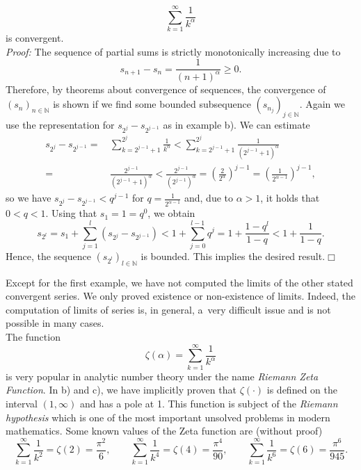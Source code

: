 \begin{example}
\begin{enumerate}[(a)]
\[ \sum_{k=1}^\infty \frac1{k^\alpha}\]
is convergent.\\
{\em Proof:} The sequence of partial sums is strictly monotonically increasing due to
\[s_{n+1}-s_n=\frac1{(n+1)^\alpha}\geq0.\]
Therefore, by theorems about convergence of sequences, the convergence of $(s_n)_{n\in\mathbb{N}}$ is shown if we find some 
bounded subsequence $(s_{n_j})_{j\in\mathbb{N}}$. Again we use the representation for $s_{2^j}-s_{2^{j-1}}$
as in example b). We can estimate
\[
\begin{aligned}
s_{2^j}-s_{2^{j-1}}=&\,\sum_{k=2^{j-1}+1}^{2^j}\frac1{k^\alpha}<\sum_{k=2^{j-1}+1}^{2^j}\frac1{(2^{j-1}+1)^\alpha}\\
=&\,\frac{2^{j-1}}{(2^{j-1}+1)^\alpha}< \frac{2^{j-1}}{(2^{j-1})^\alpha}=\left(\frac{2}{2^\alpha}\right)^{j-1}=\left(\frac{1}{2^{\alpha-1}}\right)^{j-1},
\end{aligned}\]
so we have $s_{2^j}-s_{2^{j-1}}<q^{j-1}$ for $q=\frac{1}{2^{\alpha-1}}$ and, due to $\alpha>1$, it holds that $0<q<1$. Using that $s_1=1=q^0$, we obtain
\[s_{2^l}=s_1+\sum_{j=1}^l(s_{2^j}-s_{2^{j-1}})<1+\sum_{j=0}^{l-1}q^j=1+\frac{1-q^l}{1-q}<1+\frac{1}{1-q}.\]
Hence, the sequence $(s_{2^l})_{l\in\mathbb{N}}$ is bounded. This implies the desired result.\hfill$\Box$
\end{enumerate}
\end{example}
\begin{Remark}{}
Except for the first example, we have not computed the limits of the other stated convergent series. 
We only proved existence or non-existence of limits. Indeed, the computation of limits of series is, in general, a~very difficult issue and is not possible in many cases.\\
The function
\[\zeta(\alpha)=\sum_{k=1}^\infty \frac1{k^\alpha}\]
is very popular in analytic number theory under the name \emph{Riemann Zeta Function}. In b) and c), we have implicitly proven that $\zeta(\cdot)$ is defined on the interval $(1,\infty)$ and has a pole at 1. This function is subject of the {\em Riemann hypothesis} which is one of the most important unsolved problems in modern mathematics. Some known values of the Zeta function are (without proof)
\[\sum_{k=1}^\infty \frac1{k^2}=\zeta(2)=\frac{\pi^2}6,\qquad
\sum_{k=1}^\infty \frac1{k^4}=\zeta(4)=\frac{\pi^4}{90},\qquad
\sum_{k=1}^\infty \frac1{k^6}=\zeta(6)=\frac{\pi^6}{945}.
\]
\end{Remark}{}

